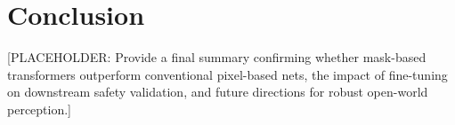\documentclass[10pt,conference]{IEEEtran}
\begin{document}
\section{Conclusion}
[PLACEHOLDER: Provide a final summary confirming whether mask-based transformers outperform conventional pixel-based nets, the impact of fine-tuning on downstream safety validation, and future directions for robust open-world perception.]


 
\end{document}
